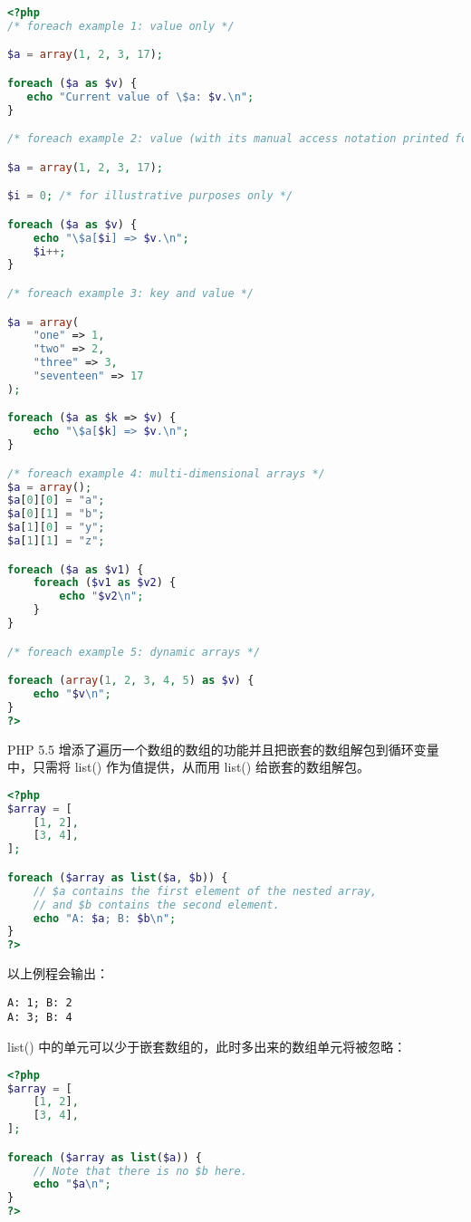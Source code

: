 \begin{lstlisting}[language=PHP]
<?php
/* foreach example 1: value only */

$a = array(1, 2, 3, 17);

foreach ($a as $v) {
   echo "Current value of \$a: $v.\n";
}

/* foreach example 2: value (with its manual access notation printed for illustration) */

$a = array(1, 2, 3, 17);

$i = 0; /* for illustrative purposes only */

foreach ($a as $v) {
    echo "\$a[$i] => $v.\n";
    $i++;
}

/* foreach example 3: key and value */

$a = array(
    "one" => 1,
    "two" => 2,
    "three" => 3,
    "seventeen" => 17
);

foreach ($a as $k => $v) {
    echo "\$a[$k] => $v.\n";
}

/* foreach example 4: multi-dimensional arrays */
$a = array();
$a[0][0] = "a";
$a[0][1] = "b";
$a[1][0] = "y";
$a[1][1] = "z";

foreach ($a as $v1) {
    foreach ($v1 as $v2) {
        echo "$v2\n";
    }
}

/* foreach example 5: dynamic arrays */

foreach (array(1, 2, 3, 4, 5) as $v) {
    echo "$v\n";
}
?>
\end{lstlisting}



PHP 5.5 增添了遍历一个数组的数组的功能并且把嵌套的数组解包到循环变量中，只需将 list() 作为值提供，从而用 list() 给嵌套的数组解包。

\begin{lstlisting}[language=PHP]
<?php
$array = [
    [1, 2],
    [3, 4],
];

foreach ($array as list($a, $b)) {
    // $a contains the first element of the nested array,
    // and $b contains the second element.
    echo "A: $a; B: $b\n";
}
?>
\end{lstlisting}

以上例程会输出：

\begin{verbatim}
A: 1; B: 2
A: 3; B: 4
\end{verbatim}

list() 中的单元可以少于嵌套数组的，此时多出来的数组单元将被忽略：

\begin{lstlisting}[language=PHP]
<?php
$array = [
    [1, 2],
    [3, 4],
];

foreach ($array as list($a)) {
    // Note that there is no $b here.
    echo "$a\n";
}
?>
\end{lstlisting}

